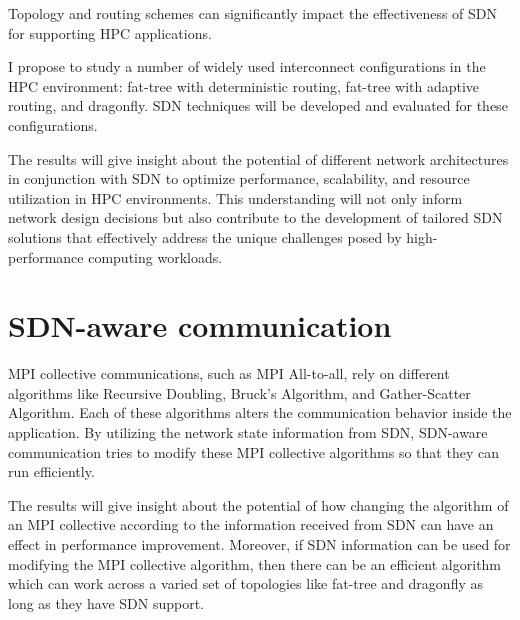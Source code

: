 Topology and routing schemes can significantly impact the effectiveness
of SDN for supporting HPC applications. 

I propose to study a number of
widely used interconnect configurations in the HPC environment: fat-tree
with deterministic routing, fat-tree with adaptive routing, and dragonfly.
SDN techniques will be developed and evaluated for
these configurations. 

The results will give insight about the potential of different 
network architectures in conjunction with SDN to optimize 
performance, scalability, and resource utilization in HPC environments. 
This understanding will not only inform network design decisions but 
also contribute to the development of tailored SDN solutions that 
effectively address the unique challenges posed by high-performance computing workloads.


\section{SDN-aware communication}

MPI collective communications, such as MPI All-to-all, 
rely on different algorithms like Recursive Doubling, 
Bruck's Algorithm, and Gather-Scatter Algorithm. 
Each of these algorithms alters the communication behavior inside the application. 
By utilizing the network state information from SDN, SDN-aware communication 
tries to modify these MPI collective algorithms so that they can run efficiently. 

\begin{comment}
\textcolor{blue}{How you do it?}
I select the MPI collective algorithm MPI Allreduce. From the SDN-controller I get the
network topology information and the ranks placement across the network
topology. With this information, I try to select only those ranks in my algorithm
 which needs to make heavy communication as close as possible in the physical network.
I then compare the performance with a regular MPI Allreduce.
\end{comment}
The results will give insight about the potential of how changing the algorithm 
of an MPI collective according to the information received from SDN can have an effect in 
performance improvement. Moreover, if SDN information can be used for modifying
the MPI collective algorithm, then there can be an efficient algorithm which can work
across a varied set of topologies like fat-tree and dragonfly as long as they have 
SDN support. 



